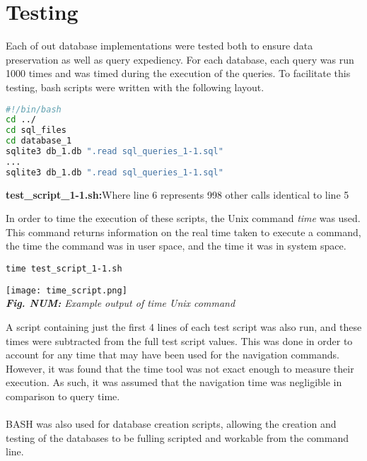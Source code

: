 \documentclass[12pt]{article}
\theoremstyle{plain}
\theoremstyle{definition}
\begin{document}
\section*{Testing}
Each of out database implementations were tested both to ensure data preservation as well as query expediency.  For each database, each query was run 1000 times and was timed during the execution of the queries.  To facilitate this testing, bash scripts were written with the following layout.
\begin{lstlisting}[language=bash]
#!/bin/bash
cd ../
cd sql_files
cd database_1
sqlite3 db_1.db ".read sql_queries_1-1.sql"
...
sqlite3 db_1.db ".read sql_queries_1-1.sql"
\end{lstlisting}
\begin{center}
\footnotesize{\textbf{test\_script\_1-1.sh:}Where line 6 represents 998 other calls identical to line 5}
\end{center}
In order to time the execution of these scripts, the Unix command \textit{time} was used. This command returns information on the real time taken to execute a command, the time the command was in user space, and the time it was in system space.\\
\begin{lstlisting}
time test_script_1-1.sh
\end{lstlisting}
\begin{center}
\texttt{[image: time\_script.png]}\\
\footnotesize{\textit{\textbf{Fig. NUM:} Example output of time Unix command}}
\end{center}
A script containing just the first 4 lines of each test script was also run, and these times were subtracted from the full test script values.  This was done in order to account for any time that may have been used for the navigation commands.  However, it was found that the time tool was not exact enough to measure their execution.  As such, it was assumed that the navigation time was negligible in comparison to query time.\\
\\
BASH was also used for database creation scripts, allowing the creation and testing of the databases to be fulling scripted and workable from the command line.\\

\end{document}
